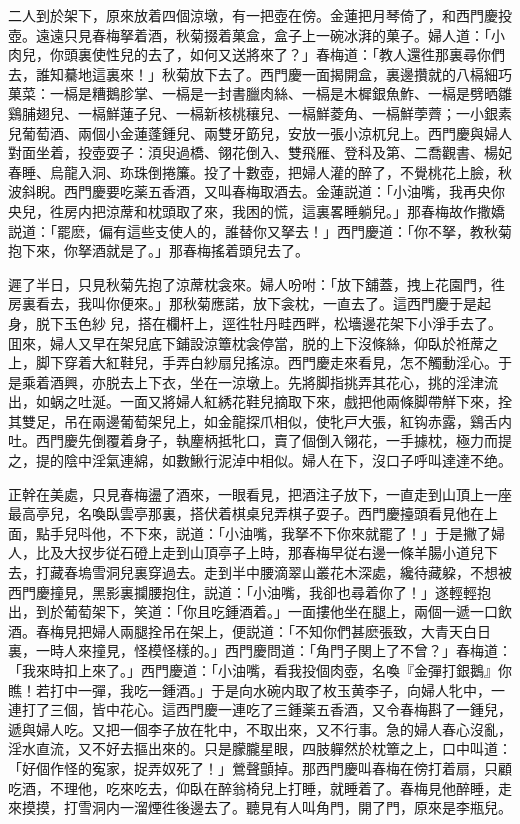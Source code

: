 二人到於架下，原來放着四個涼墩，有一把壺在傍。金蓮把月琴倚了，和西門慶投壺。遠遠只見春梅拏着酒，秋菊掇着菓盒，盒子上一碗冰湃的菓子。婦人道：「小肉兒，你頭裏使性兒的去了，如何又送將來了？」春梅道：「教人還徃那裏尋你們去，誰知驀地這裏來！」秋菊放下去了。西門慶一面揭開盒，裏邊攢就的八槅細巧菓菜：一槅是糟鵝胗掌、一槅是一封書臘肉絲、一槅是木樨銀魚鮓、一槅是劈晒雛鷄脯翅兒、一槅鮮蓮子兒、一槅新核桃穰兒、一槅鮮菱角、一槅鮮荸薺；一小銀素兒葡萄酒、兩個小金蓮蓬鍾兒、兩雙牙筯兒，安放一張小涼杌兒上。西門慶與婦人對面坐着，投壺耍子：湏臾過橋、翎花倒入、雙飛雁、登科及第、二喬觀書、楊妃春睡、烏龍入洞、珎珠倒捲簾。投了十數壺，把婦人灌的醉了，不覺桃花上臉，秋波斜睨。西門慶要吃薬五香酒，又叫春梅取酒去。金蓮説道：「小油嘴，我再央你央兒，徃房内把涼蓆和枕頭取了來，我困的慌，這裏畧睡躺兒。」那春梅故作撒嬌説道：「罷麽，偏有這些支使人的，誰替你又拏去！」西門慶道：「你不拏，教秋菊抱下來，你拏酒就是了。」那春梅搖着頭兒去了。

遲了半日，只見秋菊先抱了涼蓆枕衾來。婦人吩咐：「放下舖蓋，拽上花園門，徃房裏看去，我叫你便來。」那秋菊應諾，放下衾枕，一直去了。這西門慶于是起身，脱下玉色紗𧜽兒，搭在欄杆上，逕徃牡丹畦西畔，松墻邊花架下小淨手去了。囬來，婦人又早在架兒底下鋪設涼簟枕衾停當，脱的上下沒條絲，仰臥於袵蓆之上，脚下穿着大紅鞋兒，手弄白紗扇兒搖涼。西門慶走來看見，怎不觸動淫心。于是乘着酒興，亦脱去上下衣，坐在一涼墩上。先將脚指挑弄其花心，挑的淫津流出，如蜗之吐涎。一面又將婦人紅綉花鞋兒摘取下來，戲把他兩條脚帶觧下來，拴其雙足，吊在兩邊葡萄架兒上，如金龍探爪相似，使牝戸大張，紅钩赤露，鷄舌内吐。西門慶先倒覆着身子，執麈柄抵牝口，賣了個倒入翎花，一手據枕，極力而提之，提的陰中淫氣連綿，如數鰍行泥淖中相似。婦人在下，沒口子呼叫達達不绝。

正幹在美處，只見春梅盪了酒來，一眼看見，把酒注子放下，一直走到山頂上一座最高亭兒，名喚臥雲亭那裏，搭伏着棋桌兒弄棋子耍子。西門慶擡頭看見他在上面，點手兒呌他，不下來，説道：「小油嘴，我拏不下你來就罷了！」于是撇了婦人，比及大扠步従石磴上走到山頂亭子上時，那春梅早従右邊一條羊腸小道兒下去，打藏春塢雪洞兒裏穿過去。走到半中腰滴翠山叢花木深處，纔待藏躱，不想被西門慶撞見，黑影裏攔腰抱住，説道：「小油嘴，我卻也尋着你了！」遂輕輕抱出，到於葡萄架下，笑道：「你且吃鍾酒着。」一面摟他坐在腿上，兩個一遞一口飲酒。春梅見把婦人兩腿拴吊在架上，便説道：「不知你們甚麽張致，大青天白日裏，一時人來撞見，怪模怪樣的。」西門慶問道：「角門子関上了不曾？」春梅道：「我來時扣上來了。」西門慶道：「小油嘴，看我投個肉壺，名喚『金彈打銀鵝』你瞧！若打中一彈，我吃一鍾酒。」于是向水碗内取了枚玉黄李子，向婦人牝中，一連打了三個，皆中花心。這西門慶一連吃了三鍾薬五香酒，又令春梅斟了一鍾兒，遞與婦人吃。又把一個李子放在牝中，不取出來，又不行事。急的婦人春心沒亂，淫水直流，又不好去摳出來的。只是朦朧星眼，四肢軃然於枕簟之上，口中叫道：「好個作怪的寃家，捉弄奴死了！」鶯聲顫掉。那西門慶叫春梅在傍打着扇，只顧吃酒，不理他，吃來吃去，仰臥在醉翁椅兒上打睡，就睡着了。春梅見他醉睡，走來摸摸，打雪洞内一溜煙徃後邊去了。聽見有人叫角門，開了門，原來是李瓶兒。


